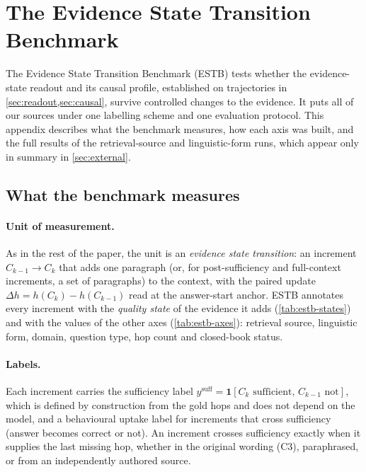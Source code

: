 \section{The Evidence State Transition Benchmark}
\label{app:estb}

The Evidence State Transition Benchmark (ESTB) tests whether the evidence-state readout and its causal profile, established on \musique{} trajectories in \cref{sec:readout,sec:causal}, survive controlled changes to the evidence. It puts all of our sources under one labelling scheme and one evaluation protocol. This appendix describes what the benchmark measures, how each axis was built, and the full results of the retrieval-source and linguistic-form runs, which appear only in summary in \cref{sec:external}.

\subsection{What the benchmark measures}
\label{app:estb-measures}

\paragraph{Unit of measurement.} As in the rest of the paper, the unit is an \emph{evidence state transition}: an increment $C_{k-1}\to C_k$ that adds one paragraph (or, for post-sufficiency and full-context increments, a set of paragraphs) to the context, with the paired update $\Delta h=h(C_k)-h(C_{k-1})$ read at the answer-start anchor. ESTB annotates every increment with the \emph{quality state} of the evidence it adds (\cref{tab:estb-states}) and with the values of the other axes (\cref{tab:estb-axes}): retrieval source, linguistic form, domain, question type, hop count and closed-book status.

\paragraph{Labels.} Each increment carries the sufficiency label $y^{\mathrm{suff}}=\mathbf 1[C_k\text{ sufficient},\,C_{k-1}\text{ not}]$, which is defined by construction from the gold hops and does not depend on the model, and a behavioural uptake label for increments that cross sufficiency (answer becomes correct or not). An increment crosses sufficiency exactly when it supplies the last missing hop, whether in the original wording (C3), paraphrased, or from an independently authored source.

